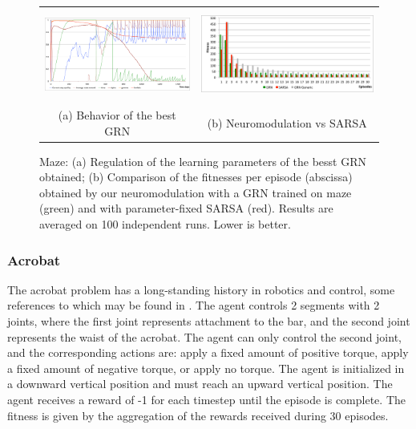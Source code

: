 \begin{figure}[b!]
\center
\begin{tabular}{cc}
\includegraphics[height=3cm]{MZ_GRNBehavior.pdf}&
\includegraphics[height=3cm]{MZ_GRNvsSARSA.pdf}\\
(a) Behavior of the best GRN &
(b) Neuromodulation vs SARSA
\end{tabular}
\caption{Maze: (a) Regulation of the learning parameters of the besst GRN obtained; (b) Comparison of the fitnesses per episode (abscissa) obtained by our neuromodulation with a GRN trained on maze (green) and with parameter-fixed SARSA (red). Results are averaged on 100 independent runs. Lower is better.}\label{fig:MZ:Results}
\end{figure}


\subsubsection{Acrobat}

The acrobat problem has a long-standing history in robotics and control, some references to which may be found in \cite{sutton1998introduction}. The agent controls 2 segments with 2 joints, where the first joint represents attachment to the bar, and the second joint represents the waist of the acrobat. The agent can only control the second joint, and the corresponding actions are: apply a fixed amount of positive torque, apply a fixed amount of negative torque, or apply no torque. The agent is initialized in a downward vertical position and must reach an upward vertical position. The agent receives a reward of -1 for each timestep until the episode is complete. The fitness is given by the aggregation of the rewards received during 30 episodes.


